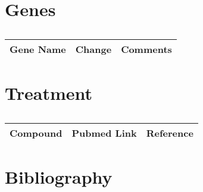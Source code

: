 \section{Genes}

\begin{table}[H]\centering
  \caption {\cite{key400}}
	\begin{tabular}{p{1cm}p{4cm}p{3cm}}
		Gene Name & Change & Comments\\
		\hline
 
		\hline
	\end{tabular}
\end{table}

\section{Treatment}

\begin{table}[H]\centering
 \caption {\cite{key470}\cite{key400}}
	\begin{tabular}{p{1cm}p{4cm}p{3cm}}
	Compound & Pubmed Link & Reference\\
		\hline
	\hline
	\end{tabular}
\end{table}



\section{Bibliography}

